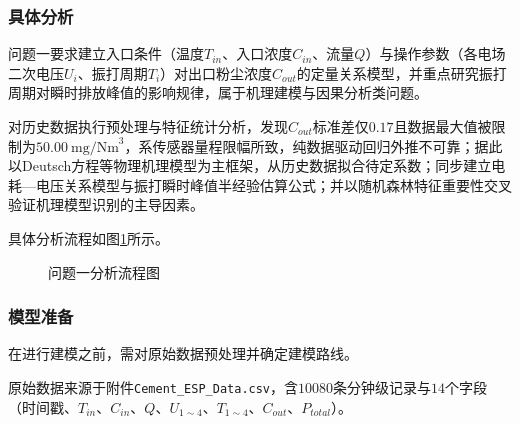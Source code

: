 
\subsubsection{具体分析}

问题一要求建立入口条件（温度$T_{in}$、入口浓度$C_{in}$、流量$Q$）与操作参数（各电场二次电压$U_i$、振打周期$T_i$）对出口粉尘浓度$C_{out}$的定量关系模型，并重点研究振打周期对瞬时排放峰值的影响规律，属于机理建模与因果分析类问题。

对历史数据执行预处理与特征统计分析，发现$C_{out}$标准差仅$0.17$且数据最大值被限制为$50.00\ \text{mg/Nm}^3$，系传感器量程限幅所致，纯数据驱动回归外推不可靠；据此以Deutsch方程等物理机理模型为主框架，从历史数据拟合待定系数；同步建立电耗—电压关系模型与振打瞬时峰值半经验估算公式；并以随机森林特征重要性交叉验证机理模型识别的主导因素。

具体分析流程如图\ref{fig:analysis1_flow}所示。

\begin{figure}[H]
  \begin{center}
    \caption{问题一分析流程图}
    \label{fig:analysis1_flow}
  \end{center}
\end{figure}

\subsubsection{模型准备}

在进行建模之前，需对原始数据预处理并确定建模路线。

原始数据来源于附件\texttt{Cement\_ESP\_Data.csv}，含$10080$条分钟级记录与$14$个字段（时间戳、$T_{in}$、$C_{in}$、$Q$、$U_{1\sim4}$、$T_{1\sim4}$、$C_{out}$、$P_{total}$）。

